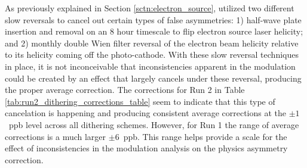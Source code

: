 As previously explained in Section \ref{sctn:electron_source}, \Qs utilized two different slow reversals to cancel out certain types of false asymmetries: 1) half-wave plate insertion and removal on an 8 hour timescale to flip electron source laser helicity;  and  2) monthly double Wien filter reversal of the electron beam helicity relative to its helicity coming off the photo-cathode. With these slow reversal techniques in place, it is not inconceivable that inconsistencies apparent in the modulation could be created by an effect that largely cancels under these reversal, producing the proper average correction. The corrections for Run 2 in Table \ref{tab:run2_dithering_corrections_table} seem to indicate that this type of cancelation is happening and producing consistent average corrections at the $\pm1$~ppb level across all dithering schemes. However, for Run 1 the range of average corrections is a much larger $\pm 6$~ppb. This range helps provide a scale for the effect of inconsistencies in the modulation analysis on the physics asymmetry correction.  

